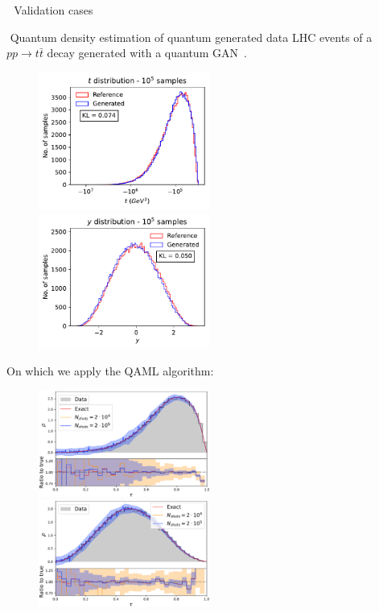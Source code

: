 \documentclass[20pt, final]{beamer}
\newlength{\colwidth}
\begin{document}
\begin{frame}[t]
\begin{columns}[t]
\begin{column}{\colwidth}
\begin{block}{\faCogs\,\, Validation cases}
  \end{block}

  \begin{block}{\faMagic\,\,Quantum density estimation of quantum generated data}
  LHC events of a $pp\to t\bar{t}$ decay generated with a quantum 
  GAN~\cite{Bravo_Prieto_2022}. 
    \begin{figure}
    \includegraphics[width=0.5\textwidth]{figures/t_qgan.pdf}%
    \includegraphics[width=0.5\textwidth]{figures/y_qgan.pdf}%
    \end{figure}
  On which we apply the QAML algorithm:
    \begin{figure}
    \includegraphics[width=0.5\textwidth]{figures/t.pdf}%
    \includegraphics[width=0.5\textwidth]{figures/rapidity.pdf}%
    \end{figure}
    

\end{block}
\end{column}
\end{columns}
\end{frame}
\end{document}
